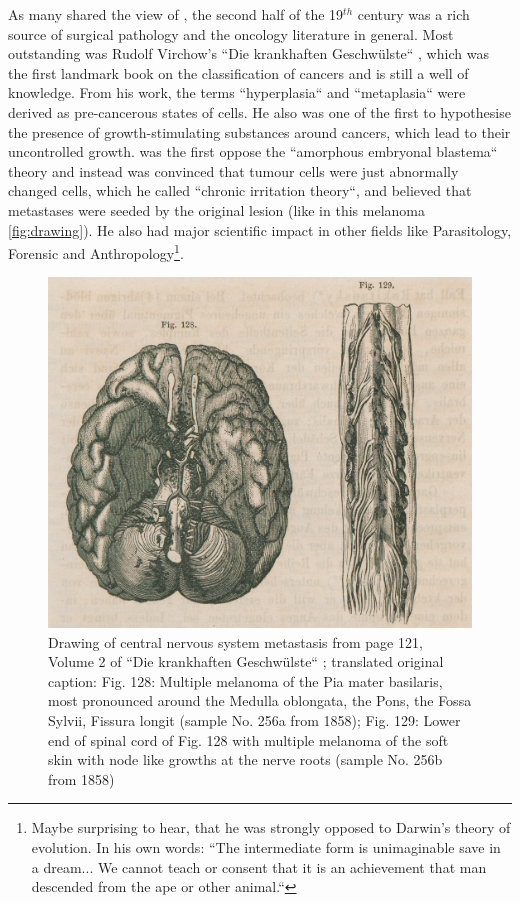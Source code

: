 As many shared the view of \citeauthor{Bennett1849}, the second half of the 19$^{th}$ century was a rich source of surgical pathology and the oncology literature in general. Most outstanding was Rudolf Virchow's ``Die krankhaften Geschw\"ulste`` \cite{Virchow1863}, which was the first landmark book on the classification of cancers and is still a well of knowledge. From his work, the terms ``hyperplasia`` and ``metaplasia``  were derived as pre-cancerous states of cells. He also was one of the first to hypothesise the presence of growth-stimulating substances around cancers, which lead to their uncontrolled growth. \citeauthor{Virchow1863} was the first  oppose the ``amorphous embryonal blastema`` theory and instead was convinced that tumour cells were just abnormally changed cells, which he called ``chronic irritation theory``, and believed that metastases were seeded by the original lesion (like in this melanoma \autoref{fig:drawing}). He also had  major scientific impact in  other fields like Parasitology, Forensic and Anthropology\footnote{Maybe surprising to hear, that he was strongly opposed to Darwin's theory of evolution. In his own words: ``The intermediate form is unimaginable save in a dream... We cannot teach or consent that it is an achievement that man descended from the ape or other animal.``}.

\begin{figure}[!ht]
\centering
\includegraphics[width=.95\linewidth]{Figures/intro/drawingMelaMeta}
\caption[Drawing of central nervous system metastasis]{Drawing of central nervous system metastasis from page 121, Volume 2 of ``Die krankhaften Geschw\"ulste`` \protect\textcite{Virchow1863}; translated original caption: Fig. 128: Multiple melanoma of the Pia mater basilaris, most pronounced around the Medulla oblongata, the Pons, the Fossa Sylvii, Fissura longit (sample No. 256a from 1858); Fig. 129: Lower end of spinal cord of Fig. 128 with multiple melanoma of the soft skin with node like growths at the nerve roots (sample No. 256b from 1858)}\label{fig:drawing}
\end{figure}

